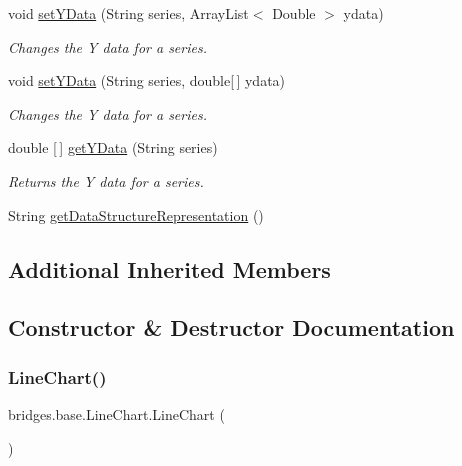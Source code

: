 \begin{DoxyCompactItemize}
void \mbox{\hyperlink{classbridges_1_1base_1_1_line_chart_a3076dc99debb599529169de40815aba2}{set\+Y\+Data}} (String series, Array\+List$<$ Double $>$ ydata)
\begin{DoxyCompactList}\small\item\em Changes the Y data for a series. \end{DoxyCompactList}\item 
void \mbox{\hyperlink{classbridges_1_1base_1_1_line_chart_aa8094fad197ae35d93f9feab5de91f59}{set\+Y\+Data}} (String series, double\mbox{[}$\,$\mbox{]} ydata)
\begin{DoxyCompactList}\small\item\em Changes the Y data for a series. \end{DoxyCompactList}\item 
double \mbox{[}$\,$\mbox{]} \mbox{\hyperlink{classbridges_1_1base_1_1_line_chart_a2bf257f45c1056808b41581af1f83645}{get\+Y\+Data}} (String series)
\begin{DoxyCompactList}\small\item\em Returns the Y data for a series. \end{DoxyCompactList}\item 
String \mbox{\hyperlink{classbridges_1_1base_1_1_line_chart_a1d481880dc94fc8c2dfdcf64d2de2a3b}{get\+Data\+Structure\+Representation}} ()
\end{DoxyCompactItemize}
\subsection*{Additional Inherited Members}


\subsection{Constructor \& Destructor Documentation}
\mbox{\label{classbridges_1_1base_1_1_line_chart_ae864fe5ae85e80ae2f035471fb216e68}} 
\subsubsection{\texorpdfstring{Line\+Chart()}{LineChart()}}
{\footnotesize\ttfamily bridges.\+base.\+Line\+Chart.\+Line\+Chart (\begin{DoxyParamCaption}{ }\end{DoxyParamCaption})}



